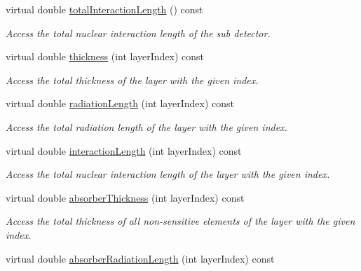 \begin{DoxyCompactItemize}
virtual double \hyperlink{class_d_d4hep_1_1_d_d_rec_1_1_layering_extension_impl_a1f474d15b2423bea9768d3a03625d507}{totalInteractionLength} () const 
\begin{DoxyCompactList}\small\item\em Access the total nuclear interaction length of the sub detector. \item\end{DoxyCompactList}\item 
virtual double \hyperlink{class_d_d4hep_1_1_d_d_rec_1_1_layering_extension_impl_a42af8e16d3f3474d29f2ee3af06ce7e7}{thickness} (int layerIndex) const 
\begin{DoxyCompactList}\small\item\em Access the total thickness of the layer with the given index. \item\end{DoxyCompactList}\item 
virtual double \hyperlink{class_d_d4hep_1_1_d_d_rec_1_1_layering_extension_impl_a49155c5d57fdeed6553f7f9f7d492b6c}{radiationLength} (int layerIndex) const 
\begin{DoxyCompactList}\small\item\em Access the total radiation length of the layer with the given index. \item\end{DoxyCompactList}\item 
virtual double \hyperlink{class_d_d4hep_1_1_d_d_rec_1_1_layering_extension_impl_ac49c6a128965c06b302fd0d2dda34de5}{interactionLength} (int layerIndex) const 
\begin{DoxyCompactList}\small\item\em Access the total nuclear interaction length of the layer with the given index. \item\end{DoxyCompactList}\item 
virtual double \hyperlink{class_d_d4hep_1_1_d_d_rec_1_1_layering_extension_impl_ad3189cae9f334260aa6fd17b45b1c8eb}{absorberThickness} (int layerIndex) const 
\begin{DoxyCompactList}\small\item\em Access the total thickness of all non-\/sensitive elements of the layer with the given index. \item\end{DoxyCompactList}\item 
virtual double \hyperlink{class_d_d4hep_1_1_d_d_rec_1_1_layering_extension_impl_ac2322db259f10e8e7ff13878c5273fb0}{absorberRadiationLength} (int layerIndex) const 

\end{DoxyCompactItemize}
